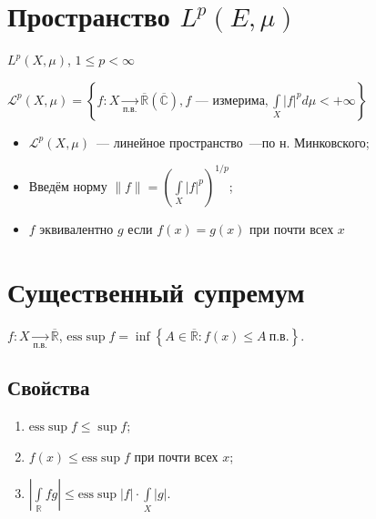 \documentclass{article}
\begin{document}
    \newpage
    
    \section{Пространство $L^p(E,\mu)$}
    
        $L^p(X, \mu)$, $1 \leqslant p < \infty$
        
        $\mathcal{L}^p (X, \mu) = \left\{ f : X \xrightarrow[\text{п.в.}]{} \overline{\mathbb{R}} (\overline{\mathbb{C}}), f \text{~--- измерима}, \int\limits_X |f|^p d \mu < +\infty \right\}$
        
        \begin{itemize}
            
            \item $\mathcal{L}^p (X, \mu)$~--- линейное пространство~---по н. Минковского;
            
            \item Введём норму $\| f \| = \left( \int\limits_X |f|^p \right)^{1/p}$;
            
            \item $f$ эквивалентно $g$ если $f(x) = g(x)$ при почти всех $x$
                
        \end{itemize}
            
    \newpage
    
    \section{Существенный супремум}
    
    $f : X \xrightarrow[\text{п.в.}]{} \overline{\mathbb{R}}$, $\mathrm{ess}\sup f = \inf \left\{ A \in \overline{\mathbb{R}} : f(x) \leqslant A \ \text{п.в.} \right\}$.
    
        \subsection{Свойства}
    
            \begin{enumerate}
        
                \item $\mathrm{ess} \sup f \leqslant \sup f$;
            
                \item $f(x) \leqslant \mathrm{ess} \sup f$ при почти всех $x$;
            
                \item $\left| \int\limits_\mathbb{R} fg \right| \leqslant \mathrm{ess} \sup |f| \cdot \int\limits_X |g|$.
            
            \end{enumerate}
        
\end{document}
